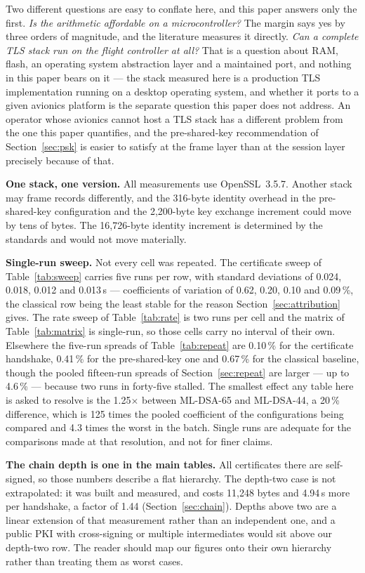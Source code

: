 \documentclass[drones,article,submit,pdftex,moreauthors]{Definitions/mdpi}
\newcommand{\mldsa}{ML-DSA}
\newcommand{\tls}{TLS}
\begin{document}
Two different questions are easy to conflate here, and this paper
answers only the first. \emph{Is the arithmetic affordable on a
microcontroller?} The margin says yes by three orders of magnitude, and
the literature measures it directly. \emph{Can a complete \tls{} stack
run on the flight controller at all?} That is a question about RAM,
flash, an operating system abstraction layer and a maintained port, and
nothing in this paper bears on it --- the stack measured here is a
production \tls{} implementation running on a desktop operating system,
and whether it ports to a given avionics platform is the separate
question this paper does not address. An
operator whose avionics cannot host a \tls{} stack has a different
problem from the one this paper quantifies, and the pre-shared-key
recommendation of Section~\ref{sec:psk} is easier to satisfy at the
frame layer than at the session layer precisely because of that.

\textbf{One stack, one version.} All measurements use OpenSSL~3.5.7.
Another stack may frame records differently, and the 316-byte identity
overhead in the pre-shared-key configuration and the 2{,}200-byte key
exchange increment could move by tens of bytes. The 16{,}726-byte
identity increment is determined by the standards and would not move
materially.

\textbf{Single-run sweep.} Not every cell was repeated. The certificate
sweep of Table~\ref{tab:sweep} carries five runs per row, with standard
deviations of 0.024, 0.018, 0.012 and 0.013\,s --- coefficients of
variation of 0.62, 0.20, 0.10 and 0.09\,\%, the classical row being the
least stable for the reason Section~\ref{sec:attribution} gives. The
rate sweep of Table~\ref{tab:rate} is two runs per cell and the matrix
of Table~\ref{tab:matrix} is single-run, so those cells carry no
interval of their own. Elsewhere the five-run spreads of
Table~\ref{tab:repeat} are 0.10\,\% for the certificate handshake,
0.41\,\% for the pre-shared-key one and 0.67\,\% for the classical
baseline, though the pooled fifteen-run spreads of
Section~\ref{sec:repeat} are larger --- up to 4.6\,\% --- because two
runs in forty-five stalled. The smallest effect any table here is asked
to resolve is the 1.25$\times$ between \mldsa{}-65 and \mldsa{}-44, a
20\,\% difference, which is 125 times the pooled coefficient of the
configurations being compared and 4.3 times the worst in the batch. Single runs are adequate for the
comparisons made at that resolution, and not for finer claims.

\textbf{The chain depth is one in the main tables.} All certificates
there are self-signed, so those numbers describe a flat hierarchy. The
depth-two case is not extrapolated: it was built and measured, and costs
11{,}248 bytes and 4.94\,s more per handshake, a factor of 1.44
(Section~\ref{sec:chain}). Depths above two are a linear extension of
that measurement rather than an independent one, and a public PKI with
cross-signing or multiple intermediates would sit above our depth-two
row. The reader should map our figures onto their own hierarchy rather
than treating them as worst cases.
\end{document}
